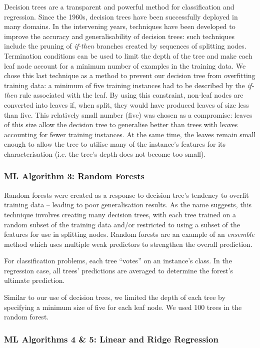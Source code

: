 Decision trees are a transparent and powerful method for classification and regression.
Since the 1960s, decision trees have been successfully deployed in many domains. 
In the intervening years, techniques have been developed to improve the accuracy and generalisability of decision trees: such techniques include the pruning of \textit{if-then} branches created by sequences of splitting nodes.
Termination conditions can be used to limit the depth of the tree and make each leaf node account for a minimum number of examples in the training data.
We chose this last technique as a method to prevent our decision tree from overfitting training data: a minimum of five training instances had to be described by the \textit{if-then} rule associated with the leaf.
By using this constraint, non-leaf nodes are converted into leaves if, when split, they would have produced leaves of size less than five. 
This relatively small number (five) was chosen as a compromise: leaves of this size allow the decision tree to generalise better than trees with leaves accounting for fewer training instances. 
At the same time, the leaves remain small enough to allow the tree to utilise many of the instance's features for its characterisation (i.e. the tree's depth does not become too small).   

\subsubsection{ML Algorithm 3: Random Forests}

Random forests \cite{RandomForests} were created as a response to decision tree's tendency to overfit training data -- leading to poor generalisation results.
As the name suggests, this technique involves creating many decision trees, with each tree trained on a random subset of the training data and/or restricted to using a subset of the features for use in splitting nodes.
Random forests are an example of an \textit{ensemble} method which uses multiple weak predictors to strengthen the overall prediction.

For classification problems, each tree ``votes'' on an instance's class.
In the regression case, all trees' predictions are averaged to determine the forest's ultimate prediction.   

Similar to our use of decision trees, we limited the depth of each tree by specifying a minimum size of five for each leaf node. 
We used 100 trees in the random forest.

\subsubsection{ML Algorithms 4 \& 5: Linear and Ridge Regression} 

